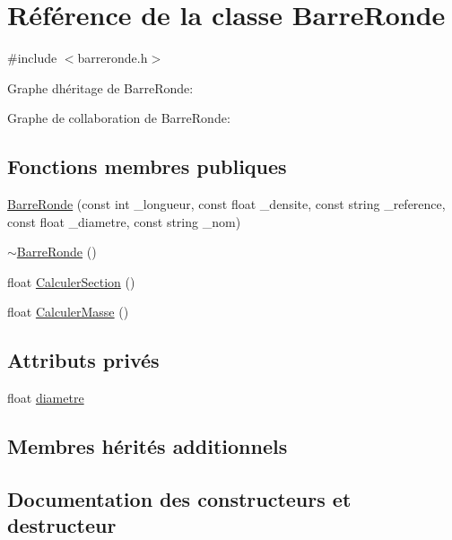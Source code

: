 \hypertarget{class_barre_ronde}{}\section{Référence de la classe Barre\+Ronde}
\label{class_barre_ronde}


{\ttfamily \#include $<$barreronde.\+h$>$}



Graphe d\textquotesingle{}héritage de Barre\+Ronde\+:


Graphe de collaboration de Barre\+Ronde\+:
\subsection*{Fonctions membres publiques}
\begin{DoxyCompactItemize}
\item 
\hyperlink{class_barre_ronde_aa0aa34f816c67b498ef6800e741d7dd8}{Barre\+Ronde} (const int \+\_\+longueur, const float \+\_\+densite, const string \+\_\+reference, const float \+\_\+diametre, const string \+\_\+nom)
\item 
\hyperlink{class_barre_ronde_aa62c3c350d2153aefcab64a20a6a795a}{$\sim$\+Barre\+Ronde} ()
\item 
float \hyperlink{class_barre_ronde_aa405f0463a7681f80a66da91c1d310a9}{Calculer\+Section} ()
\item 
float \hyperlink{class_barre_ronde_a450c58e2bfcb1300339f1c790740e5ad}{Calculer\+Masse} ()
\end{DoxyCompactItemize}
\subsection*{Attributs privés}
\begin{DoxyCompactItemize}
\item 
float \hyperlink{class_barre_ronde_ac1df0f24c2bbbb4fdb9533fa94639e92}{diametre}
\end{DoxyCompactItemize}
\subsection*{Membres hérités additionnels}


\subsection{Documentation des constructeurs et destructeur}
\mbox{\label{class_barre_ronde_aa0aa34f816c67b498ef6800e741d7dd8}} 
